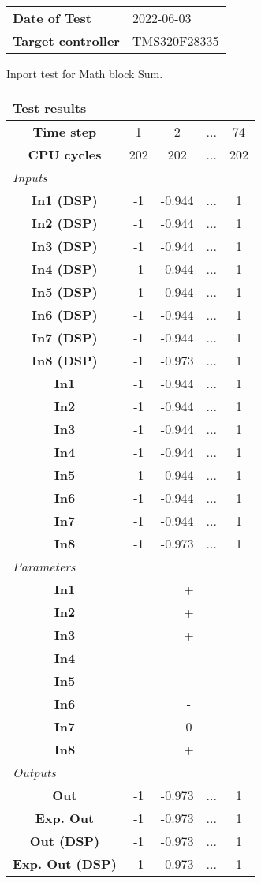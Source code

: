 \begin{tabular}{l l}
\textbf{Date of Test} & 2022-06-03 \tabularnewline
\textbf{Target controller} & TMS320F28335 \tabularnewline
\end{tabular}
\vspace{1ex}
Inport test for Math block Sum.

\vspace{1em}
\begin{tabularx}{\textwidth}{|c|c|c|>{\centering\arraybackslash}X|c|}
\hline
\multicolumn{5}{|l|}{\cellcolor[gray]{0.8}\textbf{Test results}} \tabularnewline \hline
\textbf{Time step} & 1 & 2 & ... & 74 \tabularnewline \hline
\textbf{CPU cycles} & 202 & 202 & ... & 202 \tabularnewline \hline
\multicolumn{5}{|l|}{\cellcolor[gray]{0.9}\textit{Inputs}} \tabularnewline \hline
\textbf{In1 (DSP)} & -1 & -0.944 & ... & 1 \tabularnewline \hline
\textbf{In2 (DSP)} & -1 & -0.944 & ... & 1 \tabularnewline \hline
\textbf{In3 (DSP)} & -1 & -0.944 & ... & 1 \tabularnewline \hline
\textbf{In4 (DSP)} & -1 & -0.944 & ... & 1 \tabularnewline \hline
\textbf{In5 (DSP)} & -1 & -0.944 & ... & 1 \tabularnewline \hline
\textbf{In6 (DSP)} & -1 & -0.944 & ... & 1 \tabularnewline \hline
\textbf{In7 (DSP)} & -1 & -0.944 & ... & 1 \tabularnewline \hline
\textbf{In8 (DSP)} & -1 & -0.973 & ... & 1 \tabularnewline \hline
\textbf{In1} & -1 & -0.944 & ... & 1 \tabularnewline \hline
\textbf{In2} & -1 & -0.944 & ... & 1 \tabularnewline \hline
\textbf{In3} & -1 & -0.944 & ... & 1 \tabularnewline \hline
\textbf{In4} & -1 & -0.944 & ... & 1 \tabularnewline \hline
\textbf{In5} & -1 & -0.944 & ... & 1 \tabularnewline \hline
\textbf{In6} & -1 & -0.944 & ... & 1 \tabularnewline \hline
\textbf{In7} & -1 & -0.944 & ... & 1 \tabularnewline \hline
\textbf{In8} & -1 & -0.973 & ... & 1 \tabularnewline \hline
\multicolumn{5}{|l|}{\cellcolor[gray]{0.9}\textit{Parameters}} \tabularnewline \hline
\textbf{In1} & \multicolumn{4}{c|}{+} \tabularnewline \hline
\textbf{In2} & \multicolumn{4}{c|}{+} \tabularnewline \hline
\textbf{In3} & \multicolumn{4}{c|}{+} \tabularnewline \hline
\textbf{In4} & \multicolumn{4}{c|}{-} \tabularnewline \hline
\textbf{In5} & \multicolumn{4}{c|}{-} \tabularnewline \hline
\textbf{In6} & \multicolumn{4}{c|}{-} \tabularnewline \hline
\textbf{In7} & \multicolumn{4}{c|}{0} \tabularnewline \hline
\textbf{In8} & \multicolumn{4}{c|}{+} \tabularnewline \hline
\multicolumn{5}{|l|}{\cellcolor[gray]{0.9}\textit{Outputs}} \tabularnewline \hline
\textbf{Out} & -1 & -0.973 & ... & 1 \tabularnewline \hline
\textbf{Exp. Out} & -1 & -0.973 & ... & 1 \tabularnewline \hline
\textbf{Out (DSP)} & -1 & -0.973 & ... & 1 \tabularnewline \hline
\textbf{Exp. Out (DSP)} & -1 & -0.973 & ... & 1 \tabularnewline \hline
\end{tabularx}
\vspace{1ex}

